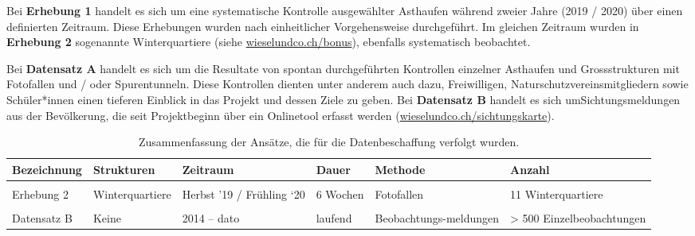 \documentclass[
  oneside]{scrbook}
\begin{document}
Bei \textbf{Erhebung 1} handelt es sich um eine systematische Kontrolle ausgewählter Asthaufen während zweier Jahre (2019 / 2020) über einen definierten Zeitraum. Diese Erhebungen wurden nach einheitlicher Vorgehensweise durchgeführt. Im gleichen Zeitraum wurden in \textbf{Erhebung 2} sogenannte Winterquartiere (siehe \href{http://www.wieselundco.ch/bonus}{wieselundco.ch/bonus}), ebenfalls systematisch beobachtet.

Bei \textbf{Datensatz A} handelt es sich um die Resultate von spontan durchgeführten Kontrollen einzelner Asthaufen und Grossstrukturen mit Fotofallen und / oder Spurentunneln. Diese Kontrollen dienten unter anderem auch dazu, Freiwilligen, Naturschutzvereinsmitgliedern sowie Schüler*innen einen tieferen Einblick in das Projekt und dessen Ziele zu geben. Bei \textbf{Datensatz B} handelt es sich umSichtungsmeldungen aus der Bevölkerung, die seit Projektbeginn über ein Onlinetool erfasst werden (\href{http://www.wieselundco.ch/beobachtung}{wieselundco.ch/sichtungskarte}).

\begin{table}

\caption{\label{tab:erhebungswochen}Zusammenfassung der Ansätze, die für die Datenbeschaffung verfolgt wurden.}
\centering
\begin{tabular}[t]{llp{20mm}lp{22mm}p{40mm}}
\toprule
Bezeichnung & Strukturen & Zeitraum & Dauer & Methode & Anzahl\\
\midrule
\cellcolor{gray!6}{Erhebung 1} & \cellcolor{gray!6}{Asthaufen} & \cellcolor{gray!6}{Herbst ’19 / Frühling ‘20} & \cellcolor{gray!6}{6 Wochen} & \cellcolor{gray!6}{Spurentunnel} & \cellcolor{gray!6}{39 Asthaufen}\\
Erhebung 2 & Winterquartiere & Herbst ’19 / Frühling ‘20 & 6 Wochen & Fotofallen & 11 Winterquartiere\\
\cellcolor{gray!6}{Datensatz A} & \cellcolor{gray!6}{Asthaufen} & \cellcolor{gray!6}{2014 - 2019} & \cellcolor{gray!6}{Variabel} & \cellcolor{gray!6}{Spurentunnel / Fotofallen} & \cellcolor{gray!6}{32 Asthaufen}\\
Datensatz B & Keine & 2014 – dato & laufend & Beobachtungs-meldungen & > 500 Einzelbeobachtungen\\
\bottomrule
\end{tabular}
\end{table}
\end{document}
